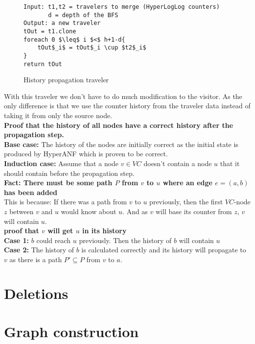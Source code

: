 \begin{figure}[h]
    \begin{lstlisting}[mathescape]
Input: t1,t2 = travelers to merge (HyperLogLog counters)
       d = depth of the BFS
Output: a new traveler
tOut = t1.clone
foreach 0 $\leq$ i $<$ h+1-d{
    tOut$_i$ = tOut$_i \cup $t2$_i$
}
return tOut
    \end{lstlisting}
    \caption{History propagation traveler}
    \label{fig:history_propagation_traveler}
\end{figure}

With this traveler we don't have to do much modification to the visitor. As the only difference is that we use the counter history from the traveler data instead of taking it from only the source node.\\

\noindent\textbf{Proof that the history of all nodes have a correct history after the propagation step.}\\

\noindent\textbf{Base case:} The history of the nodes are initially correct as the initial state is produced by HyperANF which is proven to be correct. \\

\noindent\textbf{Induction case:} Assume that a node $v \in VC$ doesn't contain a node $u$ that it should contain before the propagation step. \\

\noindent\textbf{Fact: There must be some path $P$ from $v$ to $u$ where an edge $e = (a,b)$ has been added}\\ 
This is because: If there was a path from $v$ to $u$ previously, then the first $VC$-node $z$ between $v$ and $u$ would know about $u$. And as $v$ will base its counter from $z$, $v$ will contain $u$.\\

\noindent\textbf{proof that $v$ will get $u$ in its history}\\

\noindent\textbf{Case 1:} 
$b$ could reach $u$ previously. Then the history of $b$ will contain $u$\\

\noindent\textbf{Case 2:}
The history of $b$ is calculated correctly and its history will propagate to $v$ as there is a path $P' \subseteq P$ from $v$ to $a$.\\


\section{Deletions}

\section{Graph construction}

